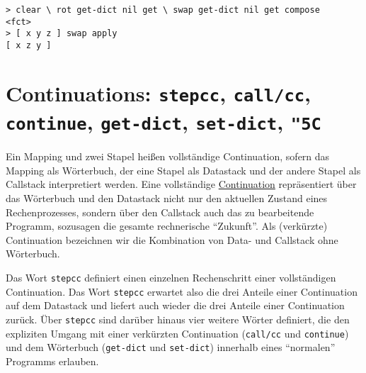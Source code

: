 \begin{verbatim}
> clear \ rot get-dict nil get \ swap get-dict nil get compose
<fct>
> [ x y z ] swap apply
[ x z y ]
\end{verbatim}


\section{Continuations: \texttt{stepcc}, \texttt{call/cc}, \texttt{continue}, \texttt{get-dict}, \texttt{set-}\-\texttt{dict}, \texttt{{\char "5C}}}
\label{Sec:Continuations}

Ein Mapping und zwei Stapel heißen vollständige Continuation, sofern das Mapping als Wörterbuch, der eine Stapel als Datastack und der andere Stapel als Callstack interpretiert werden. Eine vollständige \href{http://de.wikipedia.org/wiki/Continuation}{Continuation} repräsentiert über das Wörterbuch und den Datastack nicht nur den aktuellen Zustand eines Rechenprozesses, sondern über den Callstack auch das zu bearbeitende Programm, sozusagen die gesamte rechnerische "`Zukunft"'. Als (verkürzte) Continuation bezeichnen wir die Kombination von Data- und Callstack ohne Wörterbuch.

Das Wort \verb|stepcc| definiert einen einzelnen Rechenschritt einer voll\-stän\-di\-gen Continuation. Das Wort \verb|stepcc| erwartet also die drei Anteile einer Continuation auf dem Datastack und liefert auch wieder die drei Anteile einer Continuation zurück. Über \verb|stepcc| sind darüber hinaus vier weitere Wörter definiert, die den expliziten Umgang mit einer verkürzten Continuation  (\verb|call/cc| und \verb|continue|) und dem Wörterbuch (\verb|get-dict| und \verb|set-dict|) innerhalb eines "`normalen"' Programms erlauben.

